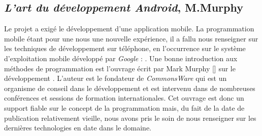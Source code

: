 \subsection{\textit{L'art du développement Android}, M.Murphy}
Le projet a exigé le développement d'une application mobile. La programmation mobile étant pour une nous une nouvelle expérience, il a fallu nous renseigner sur les techniques de développement sur téléphone, en l'occurrence sur le système d'exploitation mobile développé par \textit{Google} : \android{}. Une bonne introduction aux méthodes de programmation est l'ouvrage écrit par Mark Murphy [\cite{murphy2010art}] sur le développement \android{}. L'auteur est le fondateur de \textit{CommonsWare} qui est un organisme de conseil dans le développement \android{} et est intervenu dans de nombreuses conférences et sessions de formation internationales. Cet ouvrage est donc un support fiable sur le concept de la programmation \android{} mais, du fait de la date de publication relativement vieille, nous avons pris le soin de nous renseigner sur les dernières technologies en date dans le domaine.